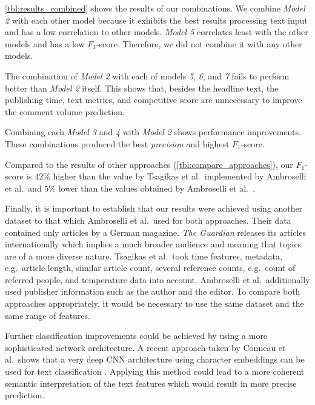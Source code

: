 \autoref{tbl:results_combined} shows the results of our combinations. We combine \textit{Model 2} with each other model because it exhibits the best results processing text input and has a low correlation to other models.
\textit{Model 5} correlates least with the other models and has a low $F_1$-score. Therefore, we did not combine it with any other models.



The combination of \textit{Model 2} with each of models \textit{5}, \textit{6}, and \textit{7} fails to perform better than \textit{Model 2} itself. 
This shows that, besides the headline text, the publishing time, text metrics, and competitive score are unnecessary to improve the comment volume prediction.

Combining each \textit{Model 3} and \textit{4} with \textit{Model 2} shows performance improvements. 
These combinations produced the best \textit{precision} and highest $F_1$-score.

Compared to the results of other approaches (\autoref{tbl:compare_approaches}), our $F_1$-score is $42\%$ higher than the value by Tsagikas et al.\ implemented by Ambroselli et al.\ and $5\%$ lower than the values obtained by Ambroselli et al.\ \cite{ambroselli2018prediction}.



Finally, it is important to establish that our results were achieved using another dataset to that which Ambroselli et al.\ used for both approaches.
Their data contained only articles by a German magazine. 
\textit{The Guardian} releases its articles internationally which implies a much broader audience and meaning that topics are of a more diverse nature.
Tsagikas et al.\ took time features, metadata, e.g.\ article length, similar article count, several reference counts, e.g.\ count of referred people, and temperature data into account.
Ambroselli et al.\ additionally used publisher information such as the author and the editor.
To compare both approaches appropriately, it would be necessary to use the same dataset and the same range of features.

Further classification improvements could be achieved by using a more sophisticated network architecture. 
A recent approach taken by Conneau et al.\ shows that a very deep CNN architecture using character embeddings can be used for text classification \cite{conneau2016very}. 
Applying this method could lead to a more coherent semantic interpretation of the text features which would result in more precise prediction.